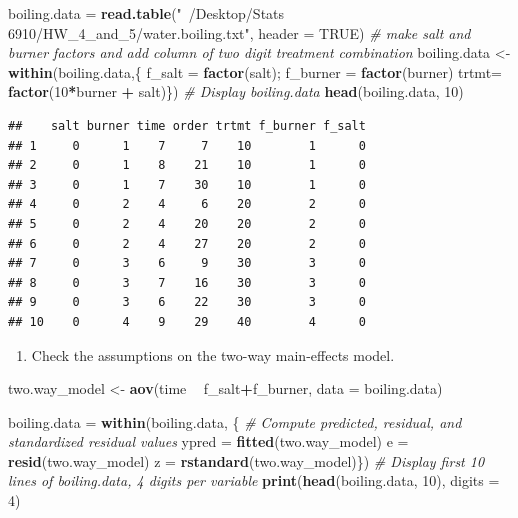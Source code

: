 \documentclass[12pt,]{article}
\newenvironment{Shaded}{\begin{snugshade}}{\end{snugshade}}
\newcommand{\KeywordTok}[1]{\textcolor[rgb]{0.13,0.29,0.53}{\textbf{#1}}}
\newcommand{\DataTypeTok}[1]{\textcolor[rgb]{0.13,0.29,0.53}{#1}}
\newcommand{\DecValTok}[1]{\textcolor[rgb]{0.00,0.00,0.81}{#1}}
\newcommand{\StringTok}[1]{\textcolor[rgb]{0.31,0.60,0.02}{#1}}
\newcommand{\CommentTok}[1]{\textcolor[rgb]{0.56,0.35,0.01}{\textit{#1}}}
\newcommand{\OtherTok}[1]{\textcolor[rgb]{0.56,0.35,0.01}{#1}}
\newcommand{\OperatorTok}[1]{\textcolor[rgb]{0.81,0.36,0.00}{\textbf{#1}}}
\newcommand{\NormalTok}[1]{#1}
\providecommand{\tightlist}{%
  \setlength{\itemsep}{0pt}\setlength{\parskip}{0pt}}
\begin{document}
\begin{Shaded}
\begin{Highlighting}[]
\NormalTok{boiling.data =}\StringTok{ }\KeywordTok{read.table}\NormalTok{(}\StringTok{"~/Desktop/Stats 6910/HW_4_and_5/water.boiling.txt"}\NormalTok{, }
                            \DataTypeTok{header =} \OtherTok{TRUE}\NormalTok{)}
\CommentTok{# make salt and burner factors and add column of two digit treatment combination}
\NormalTok{boiling.data <-}\StringTok{ }\KeywordTok{within}\NormalTok{(boiling.data,\{}
\NormalTok{   f_salt =}\StringTok{ }\KeywordTok{factor}\NormalTok{(salt); f_burner =}\StringTok{ }\KeywordTok{factor}\NormalTok{(burner)}
\NormalTok{   trtmt=}\StringTok{ }\KeywordTok{factor}\NormalTok{(}\DecValTok{10}\OperatorTok{*}\NormalTok{burner }\OperatorTok{+}\StringTok{ }\NormalTok{salt)\})}
\CommentTok{# Display boiling.data}
\KeywordTok{head}\NormalTok{(boiling.data, }\DecValTok{10}\NormalTok{)}
\end{Highlighting}
\end{Shaded}

\begin{verbatim}
##    salt burner time order trtmt f_burner f_salt
## 1     0      1    7     7    10        1      0
## 2     0      1    8    21    10        1      0
## 3     0      1    7    30    10        1      0
## 4     0      2    4     6    20        2      0
## 5     0      2    4    20    20        2      0
## 6     0      2    4    27    20        2      0
## 7     0      3    6     9    30        3      0
## 8     0      3    7    16    30        3      0
## 9     0      3    6    22    30        3      0
## 10    0      4    9    29    40        4      0
\end{verbatim}

\begin{enumerate}
\def\labelenumi{(\alph{enumi})}
\tightlist
\item
  Check the assumptions on the two-way main-effects model.
\end{enumerate}

\begin{Shaded}
\begin{Highlighting}[]
\NormalTok{two.way_model <-}\StringTok{ }\KeywordTok{aov}\NormalTok{(time }\OperatorTok{~}\StringTok{ }\NormalTok{f_salt}\OperatorTok{+}\NormalTok{f_burner, }\DataTypeTok{data =}\NormalTok{ boiling.data)}

\NormalTok{boiling.data =}\StringTok{ }\KeywordTok{within}\NormalTok{(boiling.data, \{}
  \CommentTok{# Compute predicted, residual, and standardized residual values}
\NormalTok{  ypred =}\StringTok{ }\KeywordTok{fitted}\NormalTok{(two.way_model)}
\NormalTok{  e =}\StringTok{ }\KeywordTok{resid}\NormalTok{(two.way_model) }
\NormalTok{  z =}\StringTok{ }\KeywordTok{rstandard}\NormalTok{(two.way_model)\})}
\CommentTok{# Display first 10 lines of boiling.data, 4 digits per variable}
\KeywordTok{print}\NormalTok{(}\KeywordTok{head}\NormalTok{(boiling.data, }\DecValTok{10}\NormalTok{), }\DataTypeTok{digits =} \DecValTok{4}\NormalTok{)}
\end{Highlighting}
\end{Shaded}
\end{document}
